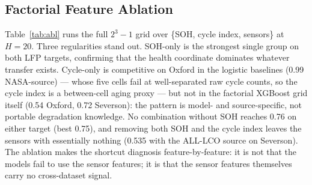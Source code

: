 \subsection{Factorial Feature Ablation}
Table~\ref{tab:abl} runs the full $2^3-1$ grid over \{SOH, cycle index, sensors\} at $H{=}20$. Three regularities stand out. SOH-only is the strongest single group on both LFP targets, confirming that the health coordinate dominates whatever transfer exists. Cycle-only is competitive on Oxford in the logistic baselines (0.99 NASA-source) --- whose five cells fail at well-separated raw cycle counts, so the cycle index is a between-cell aging proxy --- but not in the factorial XGBoost grid itself (0.54 Oxford, 0.72 Severson): the pattern is model- and source-specific, not portable degradation knowledge. No combination without SOH reaches 0.76 on either target (best 0.75), and removing both SOH and the cycle index leaves the sensors with essentially nothing (0.535 with the ALL-LCO source on Severson). The ablation makes the shortcut diagnosis feature-by-feature: it is not that the models fail to use the sensor features; it is that the sensor features themselves carry no cross-dataset signal.

